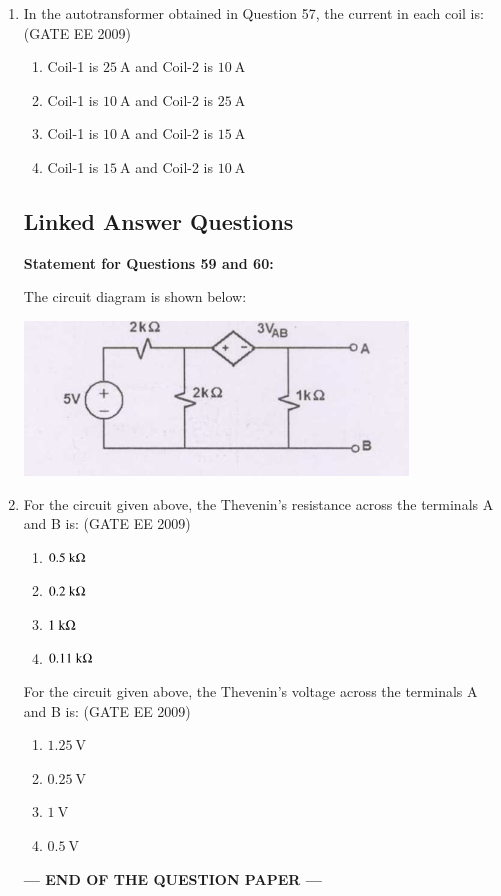 \documentclass[journal,12pt,onecolumn]{IEEEtran}
\theoremstyle{remark}
\begin{document}
\begin{flushleft}
\begin{enumerate}
\item In the autotransformer obtained in Question 57, the current in each coil is:
\hfill(GATE EE 2009)
\begin{enumerate}
    
\item  Coil-1 is \(25 \ \mathrm{A}\) and Coil-2 is \(10 \ \mathrm{A}\) 
\item  Coil-1 is \(10 \ \mathrm{A}\) and Coil-2 is \(25 \ \mathrm{A}\) 
\item  Coil-1 is \(10 \ \mathrm{A}\) and Coil-2 is \(15 \ \mathrm{A}\) 
\item Coil-1 is \(15 \ \mathrm{A}\) and Coil-2 is \(10 \ \mathrm{A}\)
\end{enumerate}

 
\subsection*{Linked Answer Questions}

\textbf{Statement for Questions 59 and 60:}

The circuit diagram is shown below:

\begin{center}
\includegraphics[width=0.6\columnwidth]{figs/Screenshot 2025-08-09 110647.png}
\label{fig:placeholder}
\end{center}

\item For the circuit given above, the Thevenin's resistance across the terminals A and B is:
\hfill(GATE EE 2009)
\begin{enumerate}
    

\item \(0.5 \ \mathrm{k\ohm}\) 
\item  \(0.2 \ \mathrm{k\ohm}\) 
\item  \(1 \ \mathrm{k\ohm}\) 
\item  \(0.11 \ \mathrm{k\ohm}\)
\end{enumerate} 

For the circuit given above, the Thevenin's voltage across the terminals A and B is:
\hfill(GATE EE 2009)
\begin{enumerate}
    

\item  \(1.25 \ \mathrm{V}\) 
\item  \(0.25 \ \mathrm{V}\) 
\item  \(1 \ \mathrm{V}\) 
\item  \(0.5 \ \mathrm{V}\)
\end{enumerate}


\begin{center}
\textbf{--- END OF THE QUESTION PAPER ---}
\end{center}

\end{enumerate}
\end{flushleft}
\end{document}
